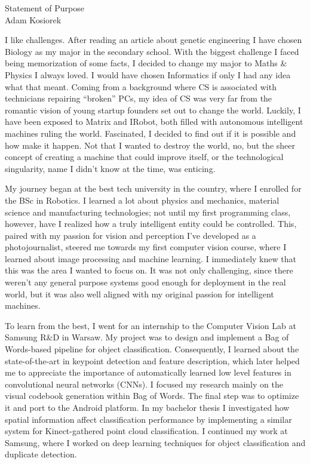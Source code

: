 \documentclass[12pt]{article}
\begin{document}
\begin{center}
{\Large Statement of Purpose} \\[.3in]
{\large Adam Kosiorek}
\end{center}

\vspace*{.5in}

I like challenges. After reading an article about genetic engineering I have chosen Biology as my major in the secondary school. With the biggest challenge I faced being memorization of some facts, I decided to change my major to Maths \& Physics I always loved. I would have chosen Informatics if only I had any idea what that meant. Coming from a background where CS is associated with technicians repairing “broken” PCs, my idea of CS was very far from the romantic vision of young startup founders set out to change the world. Luckily, I have been exposed to Matrix and IRobot, both filled with autonomous intelligent machines ruling the world. Fascinated, I decided to find out if it is possible and how make it happen. Not that I wanted to destroy the world, no, but the sheer concept of creating a machine that could improve itself, or the technological singularity, name I didn't know at the time, was enticing. 

My journey began at the best tech university in the country, where I enrolled for the BSc in Robotics. I learned a lot about physics and mechanics, material science and manufacturing technologies; not until my first programming class, however, have I realized how a truly intelligent entity could be controlled. This, paired with my passion for vision and perception I've developed as a photojournalist, steered me towards my first computer vision course, where I learned about image processing and machine learning. I immediately knew that this was the area I wanted to focus on. It was not only challenging, since there weren't any general purpose systems good enough for deployment in the real world, but it was also well aligned with my original passion for intelligent machines.

To learn from the best, I went for an internship to the Computer Vision Lab at Samsung R\&D in Warsaw. My project was to design and implement a Bag of Words-based pipeline for object classification. Consequently, I learned about the state-of-the-art in keypoint detection and feature description, which later helped me to appreciate the importance of automatically learned low level features in convolutional neural networks (CNNs). I focused my research mainly on the visual codebook generation within Bag of Words. The final step was to optimize it and port to the Android platform. In my bachelor thesis I investigated how spatial information affect classification performance by implementing a similar system for Kinect-gathered point cloud classification. I continued my work at Samsung, where I worked on deep learning techniques for object classification and duplicate detection.
\end{document}
